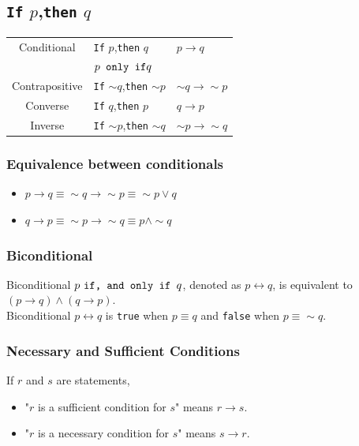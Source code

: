 \documentclass[12pt]{article}
\begin{document}
\subsection{\texttt{If} $p$,\texttt{then} $q$}
\begin{table}[h]
\centering
\begin{tabular}{cll}
Conditional &\texttt{If} $p$,\texttt{then} $q$ &$p\to q$\\
&$p \text{\texttt{ only if}} q$&\\
Contrapositive &\texttt{If} $\sim q$,\texttt{then} $\sim p$ &$\sim q\to \sim p$\\
Converse &\texttt{If} $q$,\texttt{then} $p$ &$q \to p$\\
Inverse & \texttt{If} $\sim p$,\texttt{then} $\sim q$&$\sim p \to\sim q$\\
\end{tabular}
\end{table}
\subsubsection{Equivalence between conditionals}
\begin{itemize}
\item $p\to q\equiv \sim q \to \sim p\equiv \sim p \lor q$
\item $q \to p \equiv \sim p \to \sim q\equiv p \land \sim q$
\end{itemize}
\subsubsection{Biconditional}
Biconditional $p \text{ \texttt{if, and only if }}q$, denoted as $p\leftrightarrow q$, is equivalent to $(p\to q)\land(q \to p)$.\\
Biconditional $p\leftrightarrow q$ is \texttt{true} when $p\equiv q$ and \texttt{false} when $p\equiv \sim q$.
\subsubsection{Necessary and Sufficient Conditions}
If $r$ and $s$ are statements,
\begin{itemize}
\item "$r$ is a sufficient condition for $s$" means $r\to s$.
\item "$r$ is a necessary condition for $s$" means $s\to r$.
\end{itemize}
\end{document}
